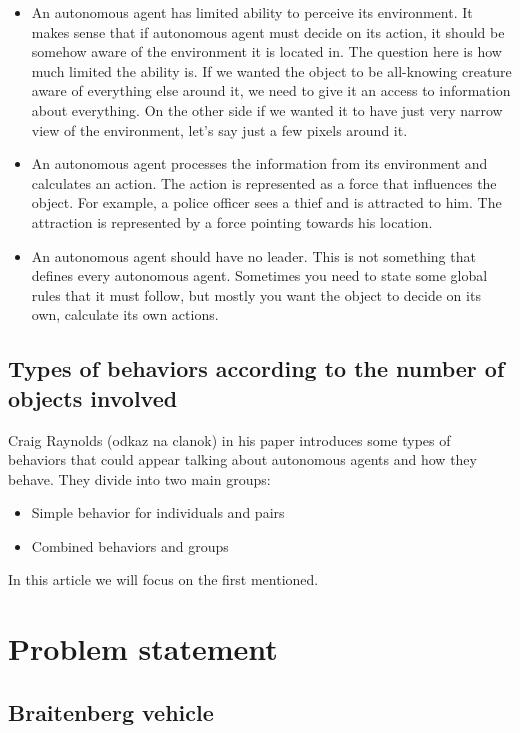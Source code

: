 \documentclass[10pt,twoside,slovak,a4paper]{article}
\begin{document}
\begin{itemize}
\item An autonomous agent has limited ability to perceive its environment. It makes sense that if autonomous agent must decide on its action, it should be somehow aware of the environment it is located in. The question here is how much limited the ability is. If we wanted the object to be all-knowing creature aware of everything else around it, we need to give it an access to information about everything. On the other side if we wanted it to have just very narrow view of the environment, let’s say just a few pixels around it.
\item An autonomous agent processes the information from its environment and calculates an action. The action is represented as a force that influences the object. For example, a police officer sees a thief and is attracted to him. The attraction is represented by a force pointing towards his location. 
\item An autonomous agent should have no leader. This is not something that defines every autonomous agent. Sometimes you need to state some global rules that it must follow, but mostly you want the object to decide on its own, calculate its own actions.
\end{itemize}



\subsection{Types of behaviors according to the number of objects involved} \label{types of behaviors}

Craig Raynolds (odkaz na clanok) in his paper introduces some types of behaviors that could appear talking about autonomous agents and how they behave. They divide into two main groups:

\begin{itemize}
\item Simple behavior for individuals and pairs
\item Combined behaviors and groups
\end{itemize}

In this article we will focus on the first mentioned. 


\section{Problem statement} \label{problem}

\subsection{Braitenberg vehicle} \label{braitenberg}
\end{document}
